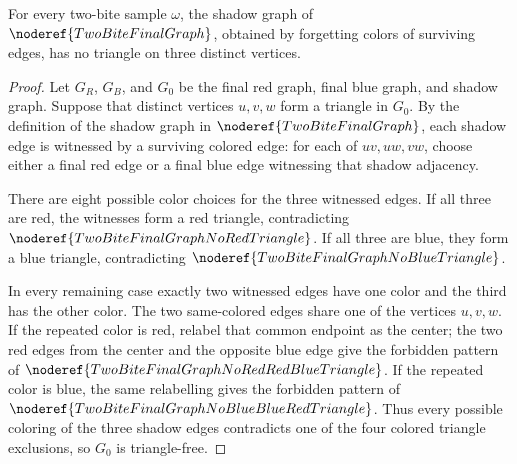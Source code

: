 \begin{helper}
For every two-bite sample \(\omega\), the shadow graph of
\(\noderef{TwoBiteFinalGraph}\), obtained by forgetting colors of surviving
edges, has no triangle on three distinct vertices.
\end{helper}
\begin{proof}
Let \(G_R\), \(G_B\), and \(G_0\) be the final red graph, final blue graph, and
shadow graph.  Suppose that distinct vertices \(u,v,w\) form a triangle in
\(G_0\).  By the definition of the shadow graph in
\(\noderef{TwoBiteFinalGraph}\), each shadow edge is witnessed by a surviving
colored edge: for each of \(uv,uw,vw\), choose either a final red edge or a
final blue edge witnessing that shadow adjacency.

There are eight possible color choices for the three witnessed edges.  If all
three are red, the witnesses form a red triangle, contradicting
\(\noderef{TwoBiteFinalGraphNoRedTriangle}\).  If all three are blue, they form
a blue triangle, contradicting \(\noderef{TwoBiteFinalGraphNoBlueTriangle}\).

In every remaining case exactly two witnessed edges have one color and the
third has the other color.  The two same-colored edges share one of the
vertices \(u,v,w\).  If the repeated color is red, relabel that common endpoint
as the center; the two red edges from the center and the opposite blue edge
give the forbidden pattern of
\(\noderef{TwoBiteFinalGraphNoRedRedBlueTriangle}\).  If the repeated color is
blue, the same relabelling gives the forbidden pattern of
\(\noderef{TwoBiteFinalGraphNoBlueBlueRedTriangle}\).  Thus every possible
coloring of the three shadow edges contradicts one of the four colored
triangle exclusions, so \(G_0\) is triangle-free.
\end{proof}
